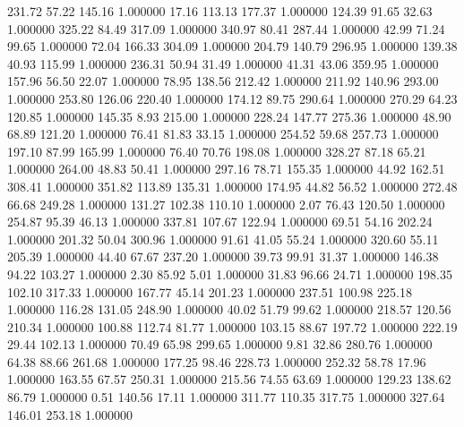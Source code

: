     231.72     57.22    145.16  1.000000
     17.16    113.13    177.37  1.000000
    124.39     91.65     32.63  1.000000
    325.22     84.49    317.09  1.000000
    340.97     80.41    287.44  1.000000
     42.99     71.24     99.65  1.000000
     72.04    166.33    304.09  1.000000
    204.79    140.79    296.95  1.000000
    139.38     40.93    115.99  1.000000
    236.31     50.94     31.49  1.000000
     41.31     43.06    359.95  1.000000
    157.96     56.50     22.07  1.000000
     78.95    138.56    212.42  1.000000
    211.92    140.96    293.00  1.000000
    253.80    126.06    220.40  1.000000
    174.12     89.75    290.64  1.000000
    270.29     64.23    120.85  1.000000
    145.35      8.93    215.00  1.000000
    228.24    147.77    275.36  1.000000
     48.90     68.89    121.20  1.000000
     76.41     81.83     33.15  1.000000
    254.52     59.68    257.73  1.000000
    197.10     87.99    165.99  1.000000
     76.40     70.76    198.08  1.000000
    328.27     87.18     65.21  1.000000
    264.00     48.83     50.41  1.000000
    297.16     78.71    155.35  1.000000
     44.92    162.51    308.41  1.000000
    351.82    113.89    135.31  1.000000
    174.95     44.82     56.52  1.000000
    272.48     66.68    249.28  1.000000
    131.27    102.38    110.10  1.000000
      2.07     76.43    120.50  1.000000
    254.87     95.39     46.13  1.000000
    337.81    107.67    122.94  1.000000
     69.51     54.16    202.24  1.000000
    201.32     50.04    300.96  1.000000
     91.61     41.05     55.24  1.000000
    320.60     55.11    205.39  1.000000
     44.40     67.67    237.20  1.000000
     39.73     99.91     31.37  1.000000
    146.38     94.22    103.27  1.000000
      2.30     85.92      5.01  1.000000
     31.83     96.66     24.71  1.000000
    198.35    102.10    317.33  1.000000
    167.77     45.14    201.23  1.000000
    237.51    100.98    225.18  1.000000
    116.28    131.05    248.90  1.000000
     40.02     51.79     99.62  1.000000
    218.57    120.56    210.34  1.000000
    100.88    112.74     81.77  1.000000
    103.15     88.67    197.72  1.000000
    222.19     29.44    102.13  1.000000
     70.49     65.98    299.65  1.000000
      9.81     32.86    280.76  1.000000
     64.38     88.66    261.68  1.000000
    177.25     98.46    228.73  1.000000
    252.32     58.78     17.96  1.000000
    163.55     67.57    250.31  1.000000
    215.56     74.55     63.69  1.000000
    129.23    138.62     86.79  1.000000
      0.51    140.56     17.11  1.000000
    311.77    110.35    317.75  1.000000
    327.64    146.01    253.18  1.000000
